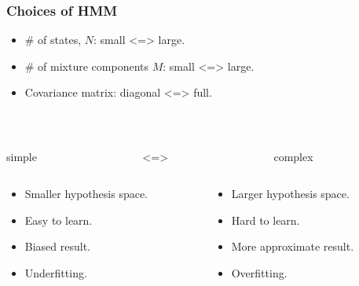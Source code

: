 \documentclass{beamer}
\begin{document}
\begin{frame}
  \frametitle{Choices of HMM}

  \begin{itemize}
    \item \# of states, $N$: \hfill small <=> large.
    \item \# of mixture components $M$: \hfill small <=> large.
    \item Covariance matrix: \hfill diagonal <=> full.
  \end{itemize}
  ~
  \begin{columns}
    \begin{column}{.4\textwidth}
    \centering simple
    \end{column}
    \begin{column}{.2\textwidth}
    \centering <=>
    \end{column}
    \begin{column}{.4\textwidth}
    \centering complex
    \end{column}
  \end{columns}
  \begin{columns}
    \begin{column}{.5\textwidth}
      \begin{itemize}
        \item Smaller hypothesis space.
        \item Easy to learn.
        \item Biased result.
        \item Underfitting.
      \end{itemize}
    \end{column}
    \begin{column}{.5\textwidth}
      \begin{itemize}
        \item Larger hypothesis space.
        \item Hard to learn.
        \item More approximate result.
        \item Overfitting.
      \end{itemize}
    \end{column}
  \end{columns}
\end{frame}
\end{document}
